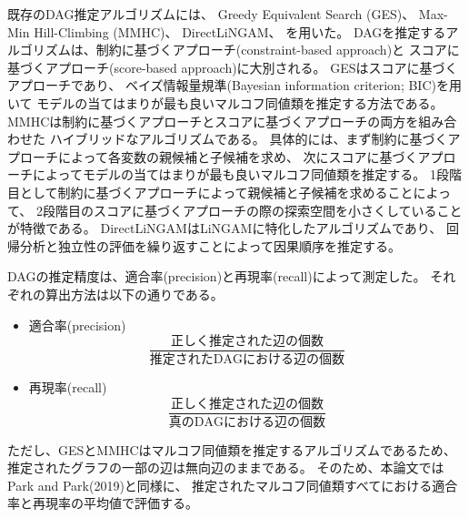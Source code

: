既存のDAG推定アルゴリズムには、
Greedy Equivalent Search (GES)\cite{Chickering2002-iq}、
Max-Min Hill-Climbing (MMHC)\cite{Tsamardinos2006-qe}、
DirectLiNGAM\cite{Shimizu2011-pd}、
を用いた。
DAGを推定するアルゴリズムは、制約に基づくアプローチ(constraint-based approach)と
スコアに基づくアプローチ(score-based approach)に大別される。
GESはスコアに基づくアプローチであり、
ベイズ情報量規準(Bayesian information criterion; BIC)を用いて
モデルの当てはまりが最も良いマルコフ同値類を推定する方法である。
MMHCは制約に基づくアプローチとスコアに基づくアプローチの両方を組み合わせた
ハイブリッドなアルゴリズムである。
具体的には、まず制約に基づくアプローチによって各変数の親候補と子候補を求め、
次にスコアに基づくアプローチによってモデルの当てはまりが最も良いマルコフ同値類を推定する。
1段階目として制約に基づくアプローチによって親候補と子候補を求めることによって、
2段階目のスコアに基づくアプローチの際の探索空間を小さくしていることが特徴である。
DirectLiNGAMはLiNGAM\cite{Shimizu2006-yu}に特化したアルゴリズムであり、
回帰分析と独立性の評価を繰り返すことによって因果順序を推定する。

DAGの推定精度は、適合率(precision)と再現率(recall)によって測定した。
それぞれの算出方法は以下の通りである。
\begin{itemize}
  \item 適合率(precision)
  \begin{equation*}
    \frac{\text{正しく推定された辺の個数}}{\text{推定されたDAGにおける辺の個数}}
  \end{equation*}

  \item 再現率(recall)
  \begin{equation*}
    \frac{\text{正しく推定された辺の個数}}{\text{真のDAGにおける辺の個数}}
  \end{equation*}
\end{itemize}
ただし、GESとMMHCはマルコフ同値類を推定するアルゴリズムであるため、
推定されたグラフの一部の辺は無向辺のままである。
そのため、本論文ではPark and Park(2019)\cite{Park2019-qy}と同様に、
推定されたマルコフ同値類すべてにおける適合率と再現率の平均値で評価する。
